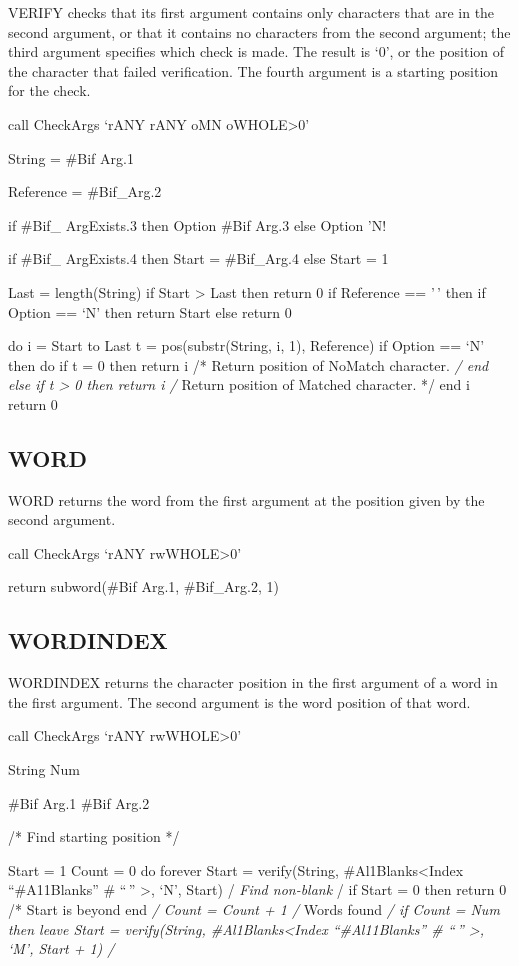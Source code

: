 VERIFY checks that its first argument contains only characters that are
in the second argument, or that it contains no characters from the
second argument; the third argument specifies which check is made. The
result is `0', or the position of the character that failed
verification. The fourth argument is a starting position for the check.

call CheckArgs `rANY rANY oMN oWHOLE\textgreater0'

String = \#Bif Arg.1

Reference = \#Bif\_Arg.2

if \#Bif\_ ArgExists.3 then Option \#Bif Arg.3 else Option 'N!

if \#Bif\_ ArgExists.4 then Start = \#Bif\_Arg.4 else Start = 1

Last = length(String) if Start \textgreater{} Last then return 0 if
Reference == '\,' then if Option == `N' then return Start else return 0

do i = Start to Last t = pos(substr(String, i, 1), Reference) if Option
== `N' then do if t = 0 then return i /* Return position of NoMatch
character. \emph{/ end else if t \textgreater{} 0 then return i /}
Return position of Matched character. */ end i return 0

\subsection{WORD}\label{word}

WORD returns the word from the first argument at the position given by
the second argument.

call CheckArgs `rANY rwWHOLE\textgreater0'

return subword(\#Bif Arg.1, \#Bif\_Arg.2, 1)

\subsection{WORDINDEX}\label{wordindex}

WORDINDEX returns the character position in the first argument of a word
in the first argument. The second argument is the word position of that
word.

call CheckArgs `rANY rwWHOLE\textgreater0'

String Num

\#Bif Arg.1 \#Bif Arg.2

/* Find starting position */

Start = 1 Count = 0 do forever Start = verify(String,
\#Al1Blanks\textless Index ``\#A11Blanks'' \# ``\,'' \textgreater, `N',
Start) /\emph{ Find non-blank }/ if Start = 0 then return 0 /* Start is
beyond end \emph{/ Count = Count + 1 /} Words found \emph{/ if Count =
Num then leave Start = verify(String, \#Al1Blanks\textless Index
``\#Al11Blanks'' \# ``\,'' \textgreater, `M', Start + 1) /}


